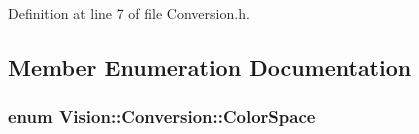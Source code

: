 Definition at line 7 of file Conversion.\+h.



\subsection{Member Enumeration Documentation}
\hypertarget{class_vision_1_1_conversion_a0a21d4ccbb013185f1974d35ec86e388}{}
\subsubsection[{Color\+Space}]{\setlength{\rightskip}{0pt plus 5cm}enum {\bf Vision\+::\+Conversion\+::\+Color\+Space}}\label{class_vision_1_1_conversion_a0a21d4ccbb013185f1974d35ec86e388}
